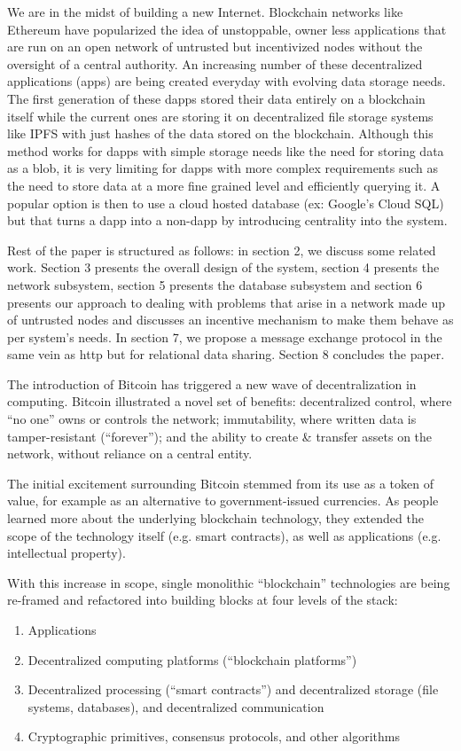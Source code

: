 We are in the midst of building a new Internet. Blockchain networks like Ethereum have popularized the idea of unstoppable, owner less applications that are run on an open network of untrusted but incentivized nodes without the oversight of a central authority. An increasing number of these decentralized applications (\DJ apps) are being created everyday with evolving data storage needs. The first generation of these dapps stored their data entirely on a blockchain itself while the current ones are storing it on decentralized file storage systems like IPFS with just hashes of the data stored on the blockchain. Although this method works for dapps with simple storage needs like the need for storing data as a blob, it is very limiting for dapps with more complex requirements such as the need to store data at a more fine grained level and efficiently querying it. A popular option is then to use a cloud hosted database (ex: Google’s Cloud SQL) but that turns a dapp into a non-dapp by introducing centrality into the system. \newline\newline

Rest of the paper is structured as follows: in section 2, we discuss some related work. Section 3 presents the overall design of the system, section 4 presents the network subsystem, section 5 presents the database subsystem and section 6 presents our approach to dealing with problems that arise in a network made up of untrusted nodes and discusses an incentive mechanism to make them behave as per system's needs. In section 7, we propose a message exchange protocol in the same vein as http but for relational data sharing. Section 8 concludes the paper.


The introduction of Bitcoin \cite{nakamoto2009bitcoin} has triggered a new wave of decentralization in computing. 
Bitcoin illustrated a novel set of benefits: decentralized control, where ``no one'' owns or controls the network; immutability,
where written data is tamper-resistant (``forever''); and the ability to create \& transfer assets on the network, without reliance on a central entity.

The initial excitement surrounding Bitcoin stemmed from its use as a token of value, for example as an alternative to government-issued currencies.
As people learned more about the underlying blockchain technology, they extended the scope of the technology itself (e.g. smart contracts), as well as applications (e.g. intellectual property).

With this increase in scope, single monolithic ``blockchain'' technologies are being re-framed and refactored into building blocks at four levels of the stack:
\begin{enumerate}
 \item Applications
 \item Decentralized computing platforms (``blockchain platforms'')
 \item Decentralized processing (``smart contracts'') and decentralized storage (file systems, databases), and decentralized communication
 \item Cryptographic primitives, consensus protocols, and other algorithms
\end{enumerate}


